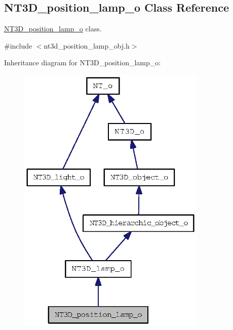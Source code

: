 \subsection{NT3D\_\-position\_\-lamp\_\-o Class Reference}
\label{class_n_t3_d__position__lamp__o}


\hyperlink{class_n_t3_d__position__lamp__o}{NT3D\_\-position\_\-lamp\_\-o} class.  




{\ttfamily \#include $<$nt3d\_\-position\_\-lamp\_\-obj.h$>$}



Inheritance diagram for NT3D\_\-position\_\-lamp\_\-o:
\nopagebreak
\begin{figure}[H]
\begin{center}
\leavevmode
\includegraphics[width=255pt]{class_n_t3_d__position__lamp__o__inherit__graph}
\end{center}
\end{figure}


